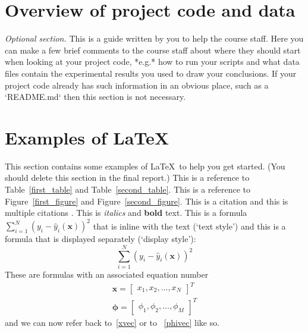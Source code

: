 \documentclass[10pt,twocolumn,letterpaper]{article}
\begin{document}
\section{Overview of project code and data}

{\em Optional section.} This is a guide written by you to help the course staff.
Here you can make a few brief comments to the course staff about where
they should start when looking at your project code, *e.g.* how to run your scripts and what
data files contain the experimental results you used to draw your conclusions.
If your project code already has such information in an obvious place, such as a `README.md`
then this section is not necessary.

\section{Examples of \LaTeX}


This section contains some examples of \LaTeX~to help you get started.
(You should delete this section in the final report.)
This is a reference to Table~\ref{first_table} and Table~\ref{second_table}.
This is a reference to Figure~\ref{first_figure} and Figure~\ref{second_figure}.
This is a citation \cite{breiman2001statistical} and this is
multiple citations \cite{breiman2001statistical,bishop2006pattern}.
This is \textit{italics} and \textbf{bold} text.
This is a formula $\sum_{i=1}^N (y_i - \hat{y}_i(\mathbf{x}))^2$
that is inline with the text (`text style') and this is a
formula that is displayed separately (`display style'):
$$
\sum_{i=1}^N (y_i - \hat{y}_i(\mathbf{x}))^2
$$
These are formulas with an associated equation number
\begin{align}
   \mathbf{x} = \begin{bmatrix}
      x_1, x_2, \ldots, x_N
   \end{bmatrix}^T    \label{xvec}\\
   \boldsymbol{\phi} = \begin{bmatrix}
      \phi_1, \phi_2, \ldots, \phi_M
   \end{bmatrix}^T    \label{phivec}
\end{align}
and we can now refer back to~\eqref{xvec} or to ~\eqref{phivec} like so.
\end{document}
